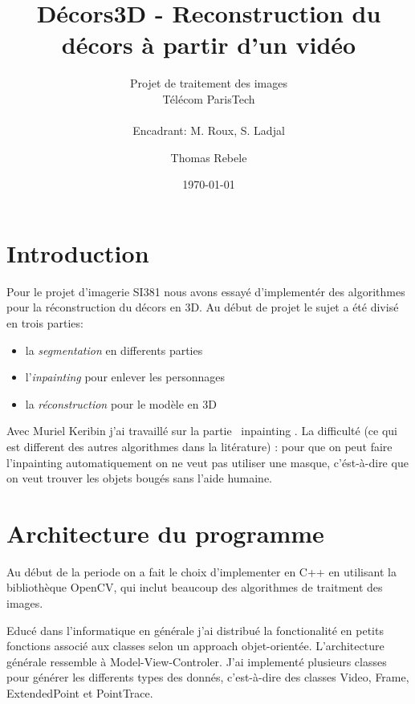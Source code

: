 \documentclass[8pt,twoside=off,titlepage=false, twocolumn]{scrartcl}
\begin{document}
\thispagestyle{empty}
\begin{titlepage}
\title{Décors3D - Reconstruction du décors à partir d'un vidéo}
\subtitle{Projet de traitement des images \\ Télécom ParisTech \\ \  \\Encadrant: 
M. Roux, S. Ladjal}
\author{Thomas Rebele}
\date{\today}
\end{titlepage}

\begingroup
 \makeatletter
 \maketitle
\endgroup


\section{Introduction}

Pour le projet d'imagerie SI381 nous avons essayé d'implementér des algorithmes pour la réconstruction du décors en 3D. Au début de projet le sujet a été divisé en trois parties:
\begin{itemize}
\item la \emph{segmentation} en differents parties
\item l'\emph{inpainting} pour enlever les personnages
\item la \emph{réconstruction} pour le modèle en 3D
\end{itemize}

Avec Muriel Keribin j'ai travaillé sur la partie \flqq\ inpainting \frqq. La difficulté (ce qui est different des autres algorithmes dans la litérature) : pour que on peut faire l'inpainting automatiquement on ne veut pas utiliser une masque, c'ést-à-dire que on veut trouver les objets bougés sans l'aide humaine.

\section{Architecture du programme}

Au début de la periode on a fait le choix d'implementer en C++ en utilisant la bibliothèque OpenCV, qui inclut beaucoup des algorithmes de traitment des images.

Educé dans l'informatique en générale j'ai distribué la fonctionalité en petits fonctions associé aux classes selon un approach objet-orientée. L'architecture générale ressemble à Model-View-Controler. J'ai implementé plusieurs classes pour générer les differents types des donnés, c'est-à-dire des classes Video, Frame, ExtendedPoint et PointTrace.
\end{document}
